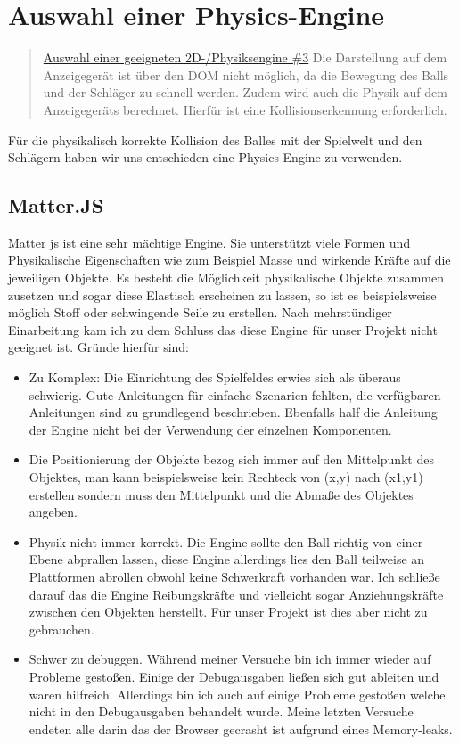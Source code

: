 \section{Auswahl einer Physics-Engine}

\begin{quote}
	\href{https://github.com/Transport-Protocol/MBC-Ping-Pong/issues/3}{Auswahl einer geeigneten 2D-/Physiksengine \#3}
	\newline
	Die Darstellung auf dem Anzeigegerät ist über den DOM nicht möglich, da die Bewegung des Balls und der Schläger zu schnell werden. Zudem wird auch die Physik auf dem Anzeigegeräts berechnet. Hierfür ist eine Kollisionserkennung erforderlich.
\end{quote}
Für die physikalisch korrekte Kollision des Balles mit der Spielwelt und den Schlägern haben wir uns entschieden eine Physics-Engine zu verwenden.

\subsection{Matter.JS}
Matter js ist eine sehr mächtige Engine. Sie unterstützt viele Formen und Physikalische Eigenschaften wie zum Beispiel Masse und wirkende Kräfte auf die jeweiligen Objekte. 
Es besteht die Möglichkeit physikalische Objekte zusammen zusetzen und sogar diese Elastisch erscheinen zu lassen, so ist es beispielsweise möglich Stoff oder schwingende Seile zu erstellen.
Nach mehrstündiger Einarbeitung kam ich zu dem Schluss das diese Engine für unser Projekt nicht geeignet ist.
Gründe hierfür sind:
\begin{itemize}
	\item
	      Zu Komplex:
	      Die Einrichtung des Spielfeldes erwies sich als überaus schwierig. Gute Anleitungen für einfache Szenarien fehlten, die verfügbaren Anleitungen sind zu grundlegend beschrieben.
	      Ebenfalls half die Anleitung der Engine nicht bei der Verwendung der einzelnen Komponenten.
	\item
	      Die Positionierung der Objekte bezog sich immer auf den Mittelpunkt des Objektes, man kann beispielsweise kein Rechteck von (x,y) nach (x1,y1) erstellen sondern muss den Mittelpunkt und die Abmaße des Objektes angeben.
	\item
	      Physik nicht immer korrekt. Die Engine sollte den Ball richtig von einer Ebene abprallen lassen, diese Engine allerdings lies den Ball teilweise an Plattformen abrollen obwohl keine Schwerkraft vorhanden war. Ich schließe darauf das die Engine Reibungskräfte und vielleicht sogar Anziehungskräfte zwischen den Objekten herstellt. Für unser Projekt ist dies aber nicht zu gebrauchen.
	\item
	      Schwer zu debuggen. Während meiner Versuche bin ich immer wieder auf Probleme gestoßen. Einige der Debugausgaben ließen sich gut ableiten und waren hilfreich. 
	      Allerdings bin ich auch auf einige Probleme gestoßen welche nicht in den Debugausgaben behandelt wurde. Meine letzten Versuche endeten alle darin das der Browser gecrasht ist aufgrund eines Memory-leaks.
\end{itemize}
